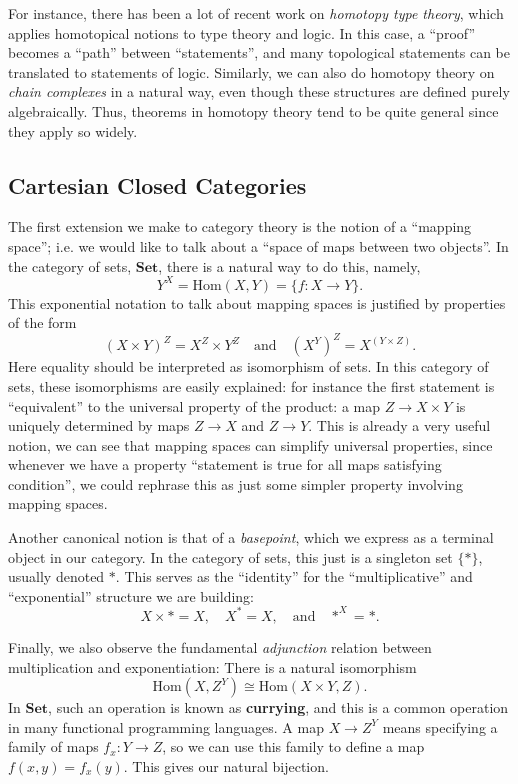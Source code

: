 \documentclass[12pt]{article}
\providecommand{\Hom}{\mathrm{Hom}}
\begin{document}
For instance, there has been a lot of recent work on \emph{homotopy type theory}, which applies homotopical notions to type theory and logic. In this case, a ``proof'' becomes a ``path'' between ``statements'', and many topological statements can be translated to statements of logic. Similarly, we can also do homotopy theory on \emph{chain complexes} in a natural way, even though these structures are defined purely algebraically. Thus, theorems in homotopy theory tend to be quite general since they apply so widely.

\subsection{Cartesian Closed Categories}

The first extension we make to category theory is the notion of a ``mapping space''; i.e. we would like to talk about a ``space of maps between two objects''. In the category of sets, $\mathbf{Set}$, there is a natural way to do this, namely,
\[ Y^X = \Hom(X, Y) = \{ f : X \to Y \}.\]
This exponential notation to talk about mapping spaces is justified by properties of the form
\[(X\times Y)^Z = X^Z\times Y^Z\quad\textrm{and}\quad (X^Y)^Z = X^{(Y\times Z)}.\]
Here equality should be interpreted as isomorphism of sets. In this category of sets, these isomorphisms are easily explained: for instance the first statement is ``equivalent'' to the universal property of the product: a map $Z \to X\times Y$ is uniquely determined by maps $Z \to X$ and $Z\to Y$. This is already a very useful notion, we can see that mapping spaces can simplify universal properties, since whenever we have a property ``statement is true for all maps satisfying condition'', we could rephrase this as just some simpler property involving mapping spaces.

Another canonical notion is that of a \emph{basepoint}, which we express as a terminal object in our category. In the category of sets, this just is a singleton set $\{*\}$, usually denoted $*$. This serves as the ``identity'' for the ``multiplicative'' and ``exponential'' structure we are building:
\[X \times * = X, \quad X^* = X,\quad\textrm{and}\quad *^X = *.\]

Finally, we also observe the fundamental \emph{adjunction} relation between multiplication and exponentiation: There is a natural isomorphism
\[
  \Hom(X, Z^Y) \cong \Hom(X\times Y, Z).
\]
In $\mathbf{Set}$, such an operation is known as \textbf{currying}, and this is a common operation in many functional programming languages. A map $X \to Z^Y$ means specifying a family of maps $f_x : Y \to Z$, so we can use this family to define a map $f(x,y)=f_x(y)$. This gives our natural bijection.
\end{document}
